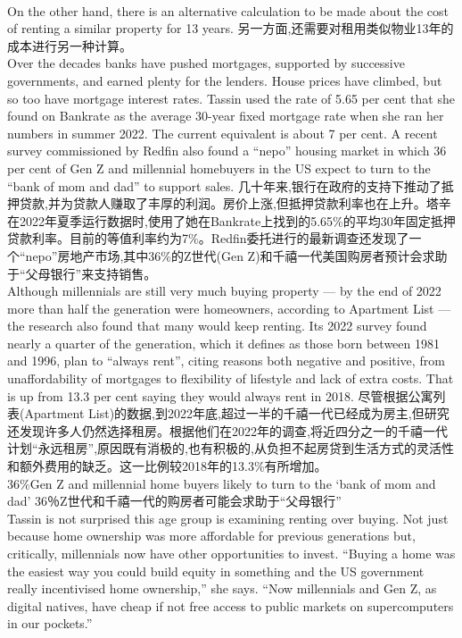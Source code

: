 \documentclass[a4paper,12pt]{article}
\begin{document}
\\On the other hand, there is an alternative calculation to be made about the cost of renting a similar property for 13 years.
另一方面,还需要对租用类似物业13年的成本进行另一种计算。
\\Over the decades banks have pushed mortgages, supported by successive governments, and earned plenty for the lenders. House prices have climbed, but so too have mortgage interest rates. Tassin used the rate of 5.65 per cent that she found on Bankrate as the average 30-year fixed mortgage rate when she ran her numbers in summer 2022. The current equivalent is about 7 per cent. A recent survey commissioned by Redfin also found a “nepo” housing market in which 36 per cent of Gen Z and millennial homebuyers in the US expect to turn to the “bank of mom and dad” to support sales.
几十年来,银行在政府的支持下推动了抵押贷款,并为贷款人赚取了丰厚的利润。房价上涨,但抵押贷款利率也在上升。塔辛在2022年夏季运行数据时,使用了她在Bankrate上找到的5.65\%的平均30年固定抵押贷款利率。目前的等值利率约为7\%。Redfin委托进行的最新调查还发现了一个“nepo”房地产市场,其中36\%的Z世代(Gen Z)和千禧一代美国购房者预计会求助于“父母银行”来支持销售。
\\Although millennials are still very much buying property — by the end of 2022 more than half the generation were homeowners, according to Apartment List — the research also found that many would keep renting. Its 2022 survey found nearly a quarter of the generation, which it defines as those born between 1981 and 1996, plan to “always rent”, citing reasons both negative and positive, from unaffordability of mortgages to flexibility of lifestyle and lack of extra costs. That is up from 13.3 per cent saying they would always rent in 2018.
尽管根据公寓列表(Apartment List)的数据,到2022年底,超过一半的千禧一代已经成为房主,但研究还发现许多人仍然选择租房。根据他们在2022年的调查,将近四分之一的千禧一代计划“永远租房”,原因既有消极的,也有积极的,从负担不起房贷到生活方式的灵活性和额外费用的缺乏。这一比例较2018年的13.3\%有所增加。
\\36\%Gen Z and millennial home buyers likely to turn to the ‘bank of mom and dad'
36％Z世代和千禧一代的购房者可能会求助于“父母银行”
\\Tassin is not surprised this age group is examining renting over buying. Not just because home ownership was more affordable for previous generations but, critically, millennials now have other opportunities to invest. “Buying a home was the easiest way you could build equity in something and the US government really incentivised home ownership,” she says. “Now millennials and Gen Z, as digital natives, have cheap if not free access to public markets on supercomputers in our pockets.”
\end{document}
